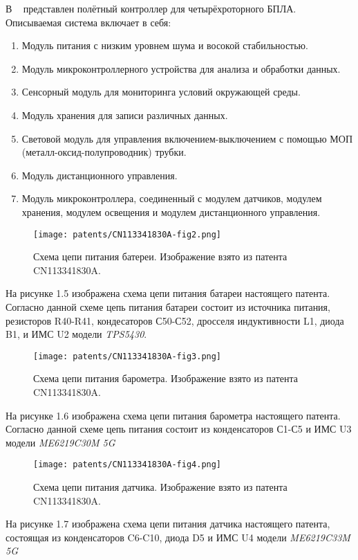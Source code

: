 В ~\cite{CN113341830A} представлен полётный контроллер для
четырёхроторного БПЛА. Описываемая система включает в себя:
\begin{enumerate}
\item Модуль питания с низким уровнем шума и восокой стабильностью.
\item Модуль микроконтроллерного устройства для анализа и обработки данных.
\item Сенсорный модуль для мониторинга условий окружающей среды.
\item Модуль хранения для записи различных данных.
\item Световой модуль для управления включением-выключением с помощью МОП (металл-оксид-полупроводник) трубки.
\item Модуль дистанционного управления.  
\item Модуль микроконтроллера, соединенный с модулем датчиков, модулем
хранения, модулем освещения и модулем дистанционного управления.
\end{enumerate}

\begin{figure}[H]
  \centering
  \texttt{[image: patents/CN113341830A-fig2.png]}
  \caption{Схема цепи питания батереи. Изображение взято из патента CN113341830A.}
\end{figure}

На рисунке 1.5 изображена схема цепи питания батареи настоящего
патента.  Согласно данной схеме цепь питания батареи состоит из
источника питания, резисторов R40-R41, кондесаторов С50-С52, дросселя
индуктивности L1, диода B1, и ИМС U2 модели \textit{TPS5430}.

\begin{figure}[H]
  \centering
  \texttt{[image: patents/CN113341830A-fig3.png]}
  \caption{Схема цепи питания барометра. Изображение взято из патента CN113341830A.}
\end{figure}

На рисунке 1.6 изображена схема цепи питания барометра настоящего патента.
Согласно данной схеме цепь питания состоит из конденсаторов С1-С5 и ИМС U3 модели
\textit{ME6219C30M 5G}

\begin{figure}[H]
  \centering
  \texttt{[image: patents/CN113341830A-fig4.png]}
  \caption{Схема цепи питания датчика. Изображение взято из патента CN113341830A.}
\end{figure}

На рисунке 1.7 изображена схема цепи питания датчика настоящего
патента, состоящая из конденсаторов C6-C10, диода D5 и ИМС U4 модели
\textit{ME6219C33M 5G}

